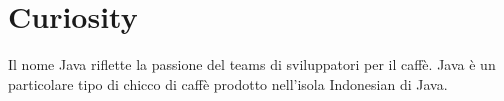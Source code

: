 \documentclass{article}
\theoremstyle{definition}
\begin{document}
\section{Curiosity}
\begin{framed}
Il nome  Java riflette la passione del teams di sviluppatori per il caff\`e. Java \`e un particolare tipo di chicco di caff\`e prodotto nell'isola  Indonesian  di Java.
\end{framed}

\clearpage







\nocite{*}
\end{document}
